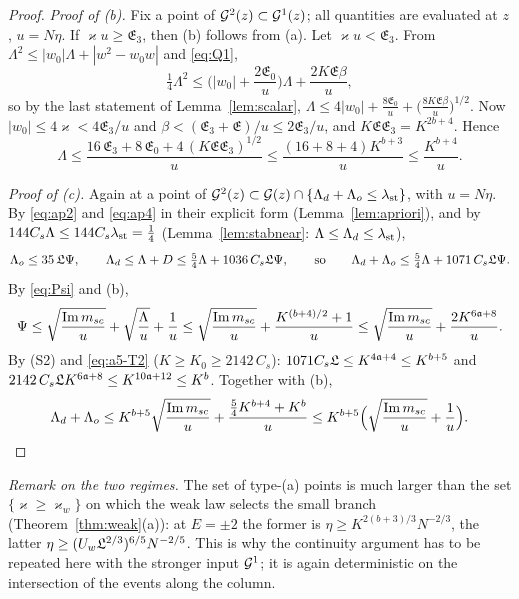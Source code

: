 \begin{proof}
\emph{Proof of \textup{(b)}.} Fix a point of $\mathcal{G}^2(z)\subset\mathcal{G}^1(z)$; all quantities are evaluated at $z$, $u=N\eta$. If $\varkappa u\ge\mathfrak E_3$, then (b) follows from (a). Let $\varkappa u<\mathfrak E_3$. From $\Lambda^2\le|w_0|\Lambda+|w^2-w_0w|$ and \eqref{eq:Q1},
\[
 \tfrac14\Lambda^2\le\Big(|w_0|+\frac{2\mathfrak E_0}{u}\Big)\Lambda+\frac{2K\mathfrak E\beta}{u},
\]
so by the last statement of Lemma~\ref{lem:scalar}, $\Lambda\le4|w_0|+\frac{8\mathfrak E_0}{u}+\big(\frac{8K\mathfrak E\beta}{u}\big)^{1/2}$. Now $|w_0|\le4\varkappa<4\mathfrak E_3/u$ and $\beta<(\mathfrak E_3+\mathfrak E)/u\le2\mathfrak E_3/u$, and $K\mathfrak E\mathfrak E_3=K^{2b+4}$. Hence
\[
 \Lambda\le\frac{16\,\mathfrak E_3+8\,\mathfrak E_0+4\,(K\mathfrak E\mathfrak E_3)^{1/2}}{u}\le\frac{(16+8+4)K^{b+3}}{u}\le\frac{K^{b+4}}{u}.
\]

\emph{Proof of \textup{(c)}.} Again at a point of $\mathcal{G}^2(z)\subset\mathcal{G}(z)\cap\{\Lambda_d+\Lambda_o\le\lambda_{\rm st}\}$, with $u=N\eta$. By \eqref{eq:ap2} and \eqref{eq:ap4} in their explicit form (Lemma~\ref{lem:apriori}), and by $144C_s\Lambda\le144C_s\lambda_{\rm st}=\frac14$ (Lemma~\ref{lem:stabnear}: $\Lambda\le\Lambda_d\le\lambda_{\rm st}$),
\[
 \Lambda_o\le35\,\mathfrak{L}\Psi,\qquad\Lambda_d\le\Lambda+D\le\tfrac54\Lambda+1036\,C_s\mathfrak{L}\Psi,\qquad\text{so}\qquad\Lambda_d+\Lambda_o\le\tfrac54\Lambda+1071\,C_s\mathfrak{L}\Psi .
\]
By \eqref{eq:Psi} and (b),
\[
 \Psi\le\sqrt{\frac{\operatorname{Im}m_{sc}}{u}}+\sqrt{\frac{\Lambda}{u}}+\frac1u\le\sqrt{\frac{\operatorname{Im}m_{sc}}{u}}+\frac{K^{(b+4)/2}+1}{u}\le\sqrt{\frac{\operatorname{Im}m_{sc}}{u}}+\frac{2K^{6\mathfrak{a}+8}}{u}.
\]
By (S2) and \eqref{eq:a5-T2} ($K\ge K_0\ge2142\,C_s$): $1071C_s\mathfrak{L}\le K^{4\mathfrak{a}+4}\le K^{b+5}$ and $2142\,C_s\mathfrak{L} K^{6\mathfrak{a}+8}\le K^{10\mathfrak{a}+12}\le K^{b}$. Together with (b),
\[
 \Lambda_d+\Lambda_o\le K^{b+5}\sqrt{\frac{\operatorname{Im}m_{sc}}{u}}+\frac{\frac54K^{b+4}+K^{b}}{u}\le K^{b+5}\Big(\sqrt{\frac{\operatorname{Im}m_{sc}}{u}}+\frac1u\Big).\qedhere
\]
\end{proof}
\noindent\emph{Remark on the two regimes.} The set of type-(a) points is much larger than the set $\{\varkappa\ge\varkappa_w\}$ on which the weak law selects the small branch (Theorem~\ref{thm:weak}(a)): at $E=\pm2$ the former is $\eta\ge K^{2(b+3)/3}N^{-2/3}$, the latter
$\eta\ge(U_w\mathfrak{L}^{2/3})^{6/5}N^{-2/5}$. This is why the continuity argument has to be repeated here with the stronger input $\mathcal{G}^1$; it is again deterministic on the intersection of the events along the column.

